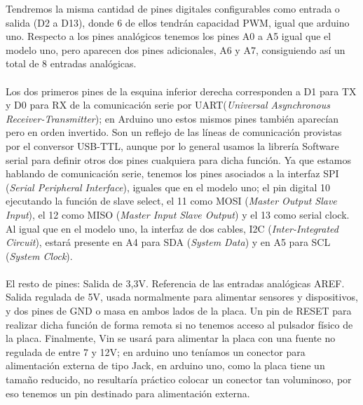 \documentclass[12pt]{article}
\begin{document}
	\pagebreak
	
	\noindent Tendremos la misma cantidad de pines digitales configurables como entrada o salida (D2 a D13), donde 6 de ellos tendrán capacidad PWM, igual que arduino uno. Respecto a los pines analógicos tenemos los pines A0 a A5 igual que el modelo uno, pero aparecen dos pines adicionales, A6 y A7, consiguiendo así un total de 8 entradas analógicas. \\
	
	 \\
	
	\noindent Los dos primeros pines de la esquina inferior derecha corresponden a D1 para TX y D0 para RX de la comunicación serie por UART(\textit{Universal Asynchronous Receiver-Transmitter}); en Arduino uno estos mismos pines también aparecían pero en orden invertido. Son un reflejo de las líneas de comunicación provistas por el conversor USB-TTL, aunque por lo general usamos la librería Software serial para definir otros dos pines cualquiera para dicha función. Ya que estamos hablando de comunicación serie, tenemos los pines asociados a la interfaz SPI (\textit{Serial Peripheral Interface}), iguales que en el modelo uno; el pin digital 10 ejecutando la función de slave select, el 11 como MOSI (\textit{Master Output Slave Input}), el 12 como MISO (\textit{Master Input Slave Output}) y el 13 como serial clock. Al igual que en el modelo uno, la interfaz de dos cables, I2C (\textit{Inter-Integrated Circuit}), estará presente en A4 para SDA (\textit{System Data}) y en A5 para SCL (\textit{System Clock}). \\
	
	 \\
		
	\noindent El resto de pines: Salida de 3,3V. Referencia de las entradas analógicas AREF. Salida regulada de 5V, usada normalmente para alimentar sensores y dispositivos, y dos pines de GND o masa en ambos lados de la placa. Un pin de RESET para realizar dicha función de forma remota si no tenemos acceso al pulsador físico de la placa. Finalmente, Vin se usará para alimentar la placa con una fuente no regulada de entre 7 y 12V; en arduino uno teníamos un conector para alimentación externa de tipo Jack, en arduino uno, como la placa tiene un tamaño reducido, no resultaría práctico colocar un conector tan voluminoso, por eso tenemos un pin destinado para alimentación externa. \\
	
\end{document}
